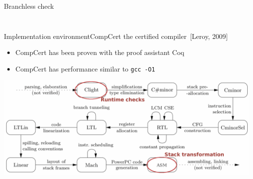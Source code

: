 \documentclass{beamer}
\begin{document}
\begin{frame}[c]{Branchless check}
\begin{columns}
\begin{column}{0.65\textwidth}
{			}
		\end{column}
	\end{columns}
\end{frame}
%
%
%

\begin{frame}[c]{Implementation environment}{CompCert the certified compiler~[Leroy, 2009]}
	\begin{itemize}
		\item CompCert has been proven with the proof assistant Coq
		\item CompCert has performance similar to \texttt{gcc -O1}
	\end{itemize}
	\hfill \break
	\includegraphics[width=\textwidth]{images/compcert_pass.pdf}
\end{frame}
\end{document}
